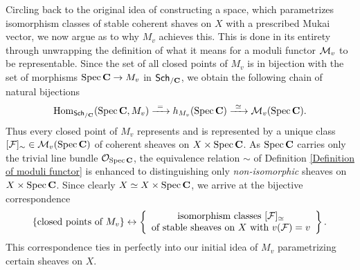 


Circling back to the original idea of constructing a space, which parametrizes isomorphism classes of stable coherent shaves on $X$ with a prescribed Mukai vector, we now argue as to why $M_v$ achieves this. This is done in its entirety through unwrapping the definition of what it means for a moduli functor $\mathcal M_v$ to be representable. Since the set of all closed points of $M_v$ is in bijection with the set of morphisms $\operatorname{Spec}\mathbf C \to M_v$ in $\mathsf{Sch}_{/\mathbf C}$, we obtain the following chain of natural bijections
\begin{equation}
    \label{eq: natural iso applied to SpecC}
    \mathrm{Hom}_{\mathsf{Sch}_{/\mathbf C}}(\operatorname{Spec}\mathbf C, M_v) \xrightarrow{\ = \ } h_{M_v}(\operatorname{Spec}\mathbf C) \xrightarrow{\ \simeq \ } \mathcal M_v(\operatorname{Spec}\mathbf C).
\end{equation}
Thus every closed point of $M_v$ represents and is represented by a unique class $[\mathcal F]_\sim \in \mathcal M_v(\operatorname{Spec}\mathbf C)$ of coherent sheaves on $X \times \operatorname{Spec}\mathbf C$. As $\operatorname{Spec}\mathbf C$ carries only the trivial line bundle ${\mathcal{O}_{\operatorname{Spec}\mathbf C}}$, the equivalence relation $\sim$ of Definition \ref{Definition of moduli functor} is enhanced to distinguishing only \emph{non-isomorphic} sheaves on $X \times \operatorname{Spec}\mathbf C$. Since clearly $X \simeq X \times \operatorname{Spec}\mathbf C$, we arrive at the bijective correspondence
\begin{equation}
    \label{eq: closed points of M}
    \{ \text{closed points of $M_v$}\} 
    \leftrightarrow \left\{
        \begin{array}{c}
            \text{isomorphism classes $[\mathcal F]_\simeq$} \\
            \text{of stable sheaves on $X$ with $v(\mathcal F) = v$}
        \end{array}
        \right\}.
\end{equation}
This correspondence ties in perfectly into our initial idea of $M_v$ parametrizing certain sheaves on $X$.  

